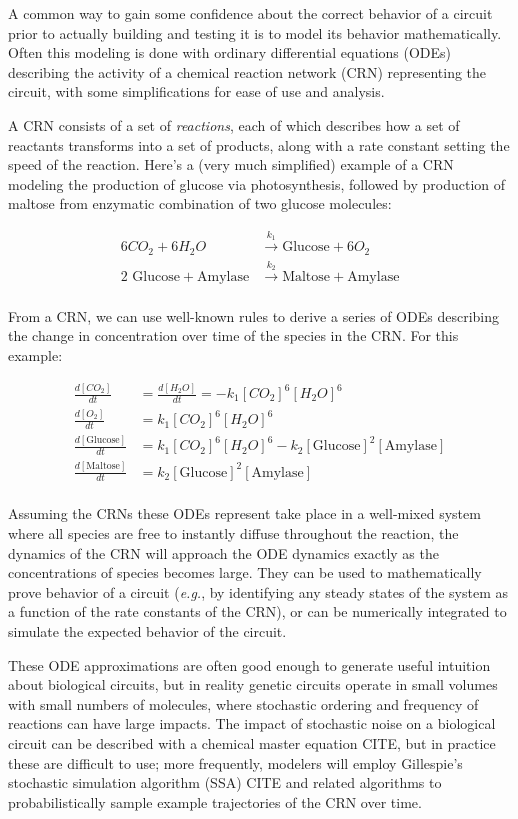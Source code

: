 \documentclass[preprint,12pt]{elsarticle}
\begin{document}
A common way to gain some confidence about the correct behavior of a circuit prior to actually building and testing it is to model its behavior mathematically. Often this modeling is done with ordinary differential equations (ODEs) describing the activity of a chemical reaction network (CRN) representing the circuit, with some simplifications for ease of use and analysis. 

A CRN consists of a set of \emph{reactions}, each of which describes how a set of reactants transforms into a set of products, along with a rate constant setting the speed of the reaction. Here's a (very much simplified) example of a CRN modeling the production of glucose via photosynthesis, followed by production of maltose from enzymatic combination of two glucose molecules:

\begin{align*}
	6CO_2 + 6 H_2O &\xrightarrow{k_1} \text{Glucose} + 6 O_2\\
	2 \text{ Glucose} + \text{Amylase} &\xrightarrow{k_2} \text{Maltose} + \text{Amylase}\\ 
\end{align*} 

From a CRN, we can use well-known rules to derive a series of ODEs describing the change in concentration over time of the species in the CRN. For this example:

\begin{align*}
	\frac{d[CO_2]}{dt} &= \frac{d[H_2O]}{dt} = -k_1[CO_2]^6[H_2O]^6\\
	\frac{d[O_2]}{dt} &= k_1[CO_2]^6[H_2O]^6 \\
	\frac{d[\text{Glucose}]}{dt} &= k_1[CO_2]^6[H_2O]^6 - k_2[\text{Glucose}]^2[\text{Amylase}]\\
	\frac{d[\text{Maltose}]}{dt} &= k_2[\text{Glucose}]^2[\text{Amylase}]\\
\end{align*}

Assuming the CRNs these ODEs represent take place in a well-mixed system where all species are free to instantly diffuse throughout the reaction, the dynamics of the CRN will approach the ODE dynamics exactly as the concentrations of species becomes large. They can be used to mathematically prove behavior of a circuit (\emph{e.g.}, by identifying any steady states of the system as a function of the rate constants of the CRN), or can be numerically integrated to simulate the expected behavior of the circuit. 

These ODE approximations are often good enough to generate useful intuition about biological circuits, but in reality genetic circuits operate in small volumes with small numbers of molecules, where stochastic ordering and frequency of reactions can have large impacts. The impact of stochastic noise on a biological circuit can be described with a chemical master equation {CITE}, but in practice these are difficult to use; more frequently, modelers will employ Gillespie's stochastic simulation algorithm (SSA) {CITE} and related algorithms to probabilistically sample example trajectories of the CRN over time. 
\end{document}
